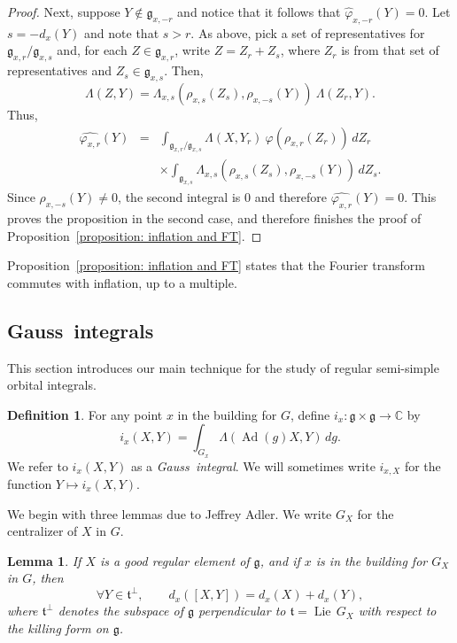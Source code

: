 \documentclass[11pt]{amsart}
\newtheorem{lemma}[theorem]{Lemma}
\theoremstyle{definition}
\newtheorem{definition}[theorem]{Definition}
\theoremstyle{remark}
\numberwithin{equation}{theorem}
\def\C{{\mathbb{C}}}
\def\GF{{G}}
\def\gF{{\mathfrak{g}}}
\def\t{{\mathfrak{t}}}
\def\vphi{{\varphi}}
\def\hphi{{\hat{\varphi}}}
\def\kill#1#2{{\Lambda\left({#1},{#2}\right)}}
\def\i{{i}}
\def\Ad{{\rm Ad}}
\def\Lie{{\operatorname{Lie}}}
\def\Ad{\operatorname{Ad}}
\begin{document}
\begin{proof}
Next, suppose $Y \not\in \gF_{x,-r}$ and notice that it follows
that $\hphi_{x,-r}(Y) = 0$. Let $s = - d_x(Y)$ and note that $s >
r$. As above, pick a set of representatives for
$\gF_{x,r}/\gF_{x,s}$ and, for each $Z\in \gF_{x,r}$, write $Z =
Z_r + Z_s$, where $Z_r$ is from that set of representatives and
$Z_s \in \gF_{x,s}$. Then,
\begin{equation}
\kill{Z}{Y}
=\Lambda_{x,s}\left(\rho_{x,s}(Z_s),\rho_{x,-s}(Y)\right)\
\kill{Z_r}{Y}.
\end{equation}
Thus,
\begin{eqnarray*}
\widehat{\vphi_{x,r}}(Y)
 &=& \int_{\gF_{x,r} / \gF_{x,s} } \kill{X}{Y_r}\
\vphi(\rho_{x,r}(Z_r))\, dZ_r \\
&& \times
\int_{\gF_{x,s}}
\Lambda_{x,s}(\rho_{x,s}(Z_s),\rho_{x,-s}(Y))\, dZ_s.
\end{eqnarray*}
Since $\rho_{x,-s}(Y)\not= 0$, the second integral is $0$ and
therefore $\widehat{\vphi_{x,r}}(Y)= 0$. This proves the
proposition in the second case, and therefore finishes the proof
of Proposition~\ref{proposition: inflation and FT}.
\end{proof}

Proposition~\ref{proposition: inflation and FT} states that the
Fourier transform commutes with inflation, up to a multiple.


\subsection{Gauss\ integrals}\label{section: gauss integrals}

This section introduces our main technique for the study of
regular semi-simple orbital integrals.

\begin{definition}\label{definition: Gauss integral}
For any point $x$ in the building for $\GF$, define $\i_x : \gF
\times \gF \to \C$ by
\begin{equation}
\i_x(X,Y) = \int_{\GF_x} \kill{\Ad(g)X}{Y}\, dg.
\end{equation}
We refer to $i_x(X,Y)$ as a \emph{Gauss\ integral}. We will
sometimes write $\i_{x,X}$ for the function $Y \mapsto i_x(X,Y)$.
\end{definition}

We begin with three lemmas due to Jeffrey Adler.  We write $G_X$
for the centralizer of $X$ in $G$.

\begin{lemma}\label{lemma: Adler 1}
If $X$ is a good regular element of $\gF$, and if $x$ is in the
building for $\GF_X$ in $\GF$, then
\begin{equation}
    \forall Y \in \t^\perp,\qquad d_x([X,Y]) = d_x(X) + d_x(Y),
\end{equation}
where $\t^\perp$ denotes the subspace of $\gF$ perpendicular to
$\t = \Lie\,\GF_X$ with respect to the killing form on $\gF$.
\end{lemma}
\end{document}

